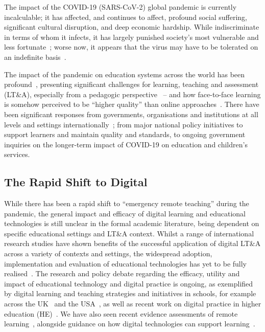 \documentclass[conference]{IEEEtran}
\begin{document}
The impact of the COVID-19 (SARS-CoV-2) global pandemic is currently
incalculable; it has affected, and continues to affect, profound
social suffering, significant cultural disruption, and deep economic
hardship. While indiscriminate in terms of whom it infects, it has
largely punished society’s most vulnerable and less
fortunate~\cite{vonbraun-et-al:2020,lancetcovid:2020,vanlancker+parolin:2020};
worse now, it appears that the virus may have to be tolerated on an
indefinite basis~\cite{kissler-et-al:2020}.

The impact of the pandemic on education systems across the world has
been profound~\cite{unescocovidedu:2020,armitage+nellums:2020},
presenting significant challenges for learning, teaching and
assessment (LT\&A), especially from a pedagogic
perspective~\cite{doucet-et-al:2020,oecd:2020,aace:2020} -- and how
face-to-face learning is somehow perceived to be ``higher quality''
than online
approaches~\cite{paechter+maier:ihe2010,scbbcnews:2020}. There have
been significant responses from governments, organisations and
institutions at all levels and settings
internationally~\cite{who:2020}; from major national policy
initiatives to support learners and maintain quality and standards, to
ongoing government inquiries on the longer-term impact of COVID-19 on
education and children’s services.

\subsection{The Rapid Shift to Digital}

While there has been a rapid shift to ``emergency remote teaching''
during the pandemic, the general impact and efficacy of digital
learning and educational technologies is still unclear in the formal
academic literature, being dependent on specific educational settings
and LT\&A context. Whilst a range of international research studies
have shown benefits of the successful application of digital LT\&A
across a variety of contexts and settings, the widespread adoption,
implementation and evaluation of educational technologies has yet to
be fully
realised~\cite{decodinglearning:2012,means:2014,ecjrc:2017,mayer:2018}.
The research and policy debate regarding the efficacy, utility and
impact of educational technology and digital practice is ongoing, as
exemplified by digital learning and teaching strategies and
initiatives in schools, for example across the
UK~\cite{digscot:2016,dfe:2019} and the USA~\cite{usdoe:2020}, as well
as recent work on digital practice in higher education
(HE)~\cite{jisc:2020,wef:2020}. We have also seen recent evidence
assessments of remote learning~\cite{eefremote:2020}, alongside
guidance on how digital technologies can support
learning~\cite{eefdigtech:2019}.
\end{document}
